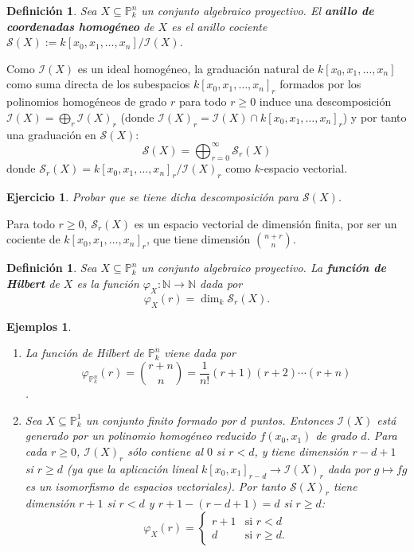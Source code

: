 \documentclass[a4paper,10pt]{book}
\newtheorem{defn}[thm]{Definición}
\newtheorem{eje}[thm]{Ejemplos}
\newtheorem{ejercicio}{Ejercicio}[chapter]
\newcommand{\PP}{\mathbb P}
\newcommand{\Pnk}{\PP^n_k}
\newcommand{\II}{{\mathcal I}}
\begin{document}
\begin{defn}
 Sea $X\subseteq\Pnk$ un conjunto algebraico proyectivo. El {\bf anillo de coordenadas homogéneo} de $X$ es el anillo cociente ${\mathcal S}(X):=k[x_0,x_1,\ldots,x_n]/\II(X)$.
\end{defn}

Como $\II(X)$ es un ideal homogéneo, la graduación natural de $k[x_0,x_1,\ldots,x_n]$ como suma directa de los subespacios $k[x_0,x_1,\ldots,x_n]_r$ formados por los polinomios homogéneos de grado $r$ para todo $r\geq 0$ induce una descomposición $\II(X)=\bigoplus_r\II(X)_r$ (donde $\II(X)_r=\II(X)\cap k[x_0,x_1,\ldots,x_n]_r$) y por tanto una graduación en ${\mathcal S}(X)$:
$$
{\mathcal S}(X)=\bigoplus_{r=0}^{\infty}{\mathcal S}_r(X)
$$
donde ${\mathcal S}_r(X)=k[x_0,x_1,\ldots,x_n]_r/\II(X)_r$ como $k$-espacio vectorial.

\begin{ejercicio}
 Probar que se tiene dicha descomposición para ${\mathcal S}(X)$.
\end{ejercicio}

Para todo $r\geq 0$, ${\mathcal S}_r(X)$ es un espacio vectorial de dimensión finita, por ser un cociente de $k[x_0,x_1,\ldots,x_n]_r$, que tiene dimensión ${{n+r}\choose n}$.

\begin{defn}
 Sea $X\subseteq\Pnk$ un conjunto algebraico proyectivo. La {\bf función de Hilbert} de $X$ es la función $\varphi_X:{\mathbb N}\to{\mathbb N}$ dada por
$$
\varphi_X(r)=\dim_k{\mathcal S}_r(X).
$$
\end{defn}

\begin{eje}\label{hilbert}
\begin{enumerate}
        \item La función de Hilbert de $\Pnk$ viene dada por $$\varphi_{\Pnk}(r)={{r+n}\choose n}=\frac{1}{n!}(r+1)(r+2)\cdots(r+n)$$.
\item Sea $X\subseteq\PP^1_k$ un conjunto finito formado por $d$ puntos. Entonces $\II(X)$ está generado por un polinomio homogéneo reducido $f(x_0,x_1)$ de grado $d$. Para cada $r\geq 0$, $\II(X)_r$ sólo contiene al $0$ si $r<d$, y tiene dimensión $r-d+1$ si $r\geq d$ (ya que la aplicación lineal $k[x_0,x_1]_{r-d}\to\II(X)_r$ dada por $g\mapsto fg$ es un isomorfismo de espacios vectoriales). Por tanto ${\mathcal S}(X)_r$ tiene dimensión $r+1$ si $r<d$ y $r+1-(r-d+1)=d$ si $r\geq d$:
$$
\varphi_X(r)=\left\{\begin{array}{ll}
                     r+1 & \text{si }r<d \\
                     d & \text{si }r\geq d.
                    \end{array}\right.
$$

\end{enumerate}
\end{eje}
\end{document}
